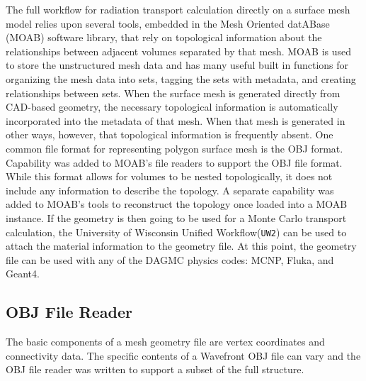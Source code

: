 \documentclass{anstrans}
\begin{document}
The full workflow for radiation transport calculation directly on a surface mesh model
relies upon several tools, embedded in the Mesh Oriented datABase (MOAB) software library\cite{???}, that
rely on topological information about the relationships between adjacent volumes separated by that mesh.
MOAB is used to store the unstructured mesh data 
and has many useful built in functions for organizing the mesh data into sets, 
tagging the sets with metadata, and creating relationships between sets.
When the surface mesh is generated directly from CAD-based geometry, the necessary topological information
is automatically incorporated into the metadata of that mesh.  When that mesh is generated in other
ways, however, that topological information is frequently absent.  One common file format for
representing polygon surface mesh is the OBJ format\cite{obj}.  Capability was
added to MOAB's file readers to support the OBJ file format.  While this format allows for volumes to be
nested topologically, it does not include any information to describe the topology.  A separate capability
was added to MOAB's tools to reconstruct the topology once loaded into a MOAB instance.
If the geometry is then going to be used 
for a Monte Carlo transport calculation, the University of Wisconsin Unified Workflow(\texttt{UW2}) can be used to attach 
the material information to the geometry file.  At this point, the geometry file
can be used with any of the DAGMC physics codes: MCNP, Fluka, and Geant4.

\subsection{OBJ File Reader}
The basic components of a mesh geometry file are vertex coordinates and connectivity data.
The specific contents of a Wavefront OBJ file can vary \cite{obj} and the OBJ file reader
was written to support a subset of the full structure. 
\end{document}

